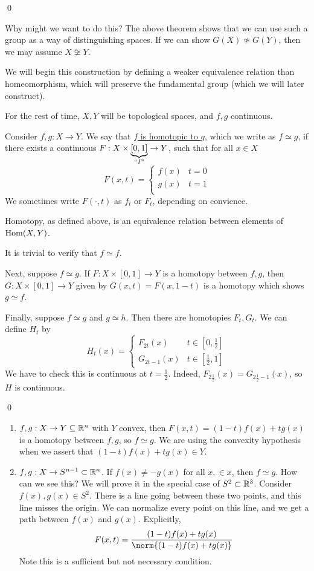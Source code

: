 \documentclass[x11names,reqno,14pt]{extarticle}
\begin{document}
\qed

Why might we want to do this? The above theorem shows that we can use such a group as a way of distinguishing spaces. If we can show $G(X)\not\simeq G(Y)$, then we may assume $X\not\cong Y$. 

We will begin this construction by defining a weaker equivalence relation than homeomorphism, which will preserve the fundamental group (which we will later construct). 

For the rest of time, $X, Y$ will be topological spaces, and $f, g$ continuous. 


Consider $f, g:X\to Y$. We say that \underline{$f$ is homotopic to $g$}, which we write as $f \simeq g$, if there exists a continuous $F:X\times\underbrace{[0, 1]}_{``I"}\to Y$, such that for all $x \in X$
\[
F(x, t) = \begin{cases} f(x) & t = 0 \\ g(x) & t = 1 \\ \end{cases}
\]
We sometimes write $F(\cdot, t)$ as $f_t$ or $F_t$, depending on convience. 

\lem

Homotopy, as defined above, is an equivalence relation between elements of ${\mathrm{Hom}}(X, Y)$. 

\proof

It is trivial to verify that $f \simeq f$. 

Next, suppose $f \simeq g$. If $F:X\times [0,1]\to Y$ is a homotopy between $f, g$, then $G:X\times[0, 1]\to Y$ given by $G(x, t) = F(x, 1 - t)$ is a homotopy which shows $g \simeq f$. 

Finally, suppose $f \simeq g$ and $g \simeq h$. Then there are homotopies $F_t, G_t$. We can define $H_t$ by 
\[
H_t(x) = \begin{cases} F_{2t}(x) & t \in [0, \frac{1}{2}] \\ G_{2t - 1}(x) & t \in [\frac{1}{2}, 1] \end{cases}
\]
We have to check this is continuous at $t = \frac{1}{2}$. Indeed, $F_{2\frac{1}{2}}(x) = G_{2\frac{1}{2} - 1}(x)$, so $H$ is continuous. 

\qed

\exm

\begin{enumerate}
\item $f, g:X\to Y\subseteq \mathbb{R}^n$ with $Y$ convex, then $F(x, t) = (1 - t)f(x) + tg(x)$ is a homotopy between $f, g$, so $f \simeq g$. We are using the convexity hypothesis when we assert that $(1 - t)f(x) + tg(x) \in Y$. 
\item $f, g:X\to S^{n - 1}\subset \mathbb{R}^n$. If $f(x) \neq -g(x)$ for all $x, \in x$, then $f\simeq g$. How can we see this? We will prove it in the special case of $S^2 \subset \mathbb{R}^3$. Consider $f(x), g(x) \in S^2$. There is a line going between these two points, and this line misses the origin. We can normalize every point on this line, and we get a path between $f(x)$ and $g(x)$. Explicitly, 
\[
F(x, t) = \frac{(1 - t)f(x) + tg(x)}{\norm{(1 - t)f(x) + tg(x)}}
\]
Note this is a sufficient but not necessary condition. 
\end{enumerate}
\end{document}
